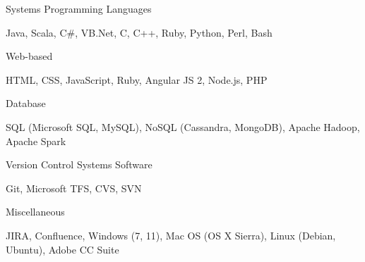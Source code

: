 \begin{cventries}
  \cventry
    {Systems}
    {Programming Languages}
    { }
    { }
    {
      \begin{cvitems}
        \item {Java, Scala, C\#, VB.Net, C, C++, Ruby, Python, Perl, Bash}
      \end{cvitems}
    }
  \cventry
    {Web-based}
    { }
    { }
    { }
    {
      \begin{cvitems}
        \item {HTML, CSS, JavaScript, Ruby, Angular JS 2, Node.js, PHP}
      \end{cvitems}
    }
  \cventry
    {Database}
    { }
    { }
    { }
    {
      \begin{cvitems}
        \item {SQL (Microsoft SQL, MySQL), NoSQL (Cassandra, MongoDB), Apache Hadoop, Apache Spark}
      \end{cvitems}
    }
  \cventry
    {Version Control Systems}
    {Software}
    { }
    { }
    {
      \begin{cvitems}
        \item {Git, Microsoft TFS, CVS, SVN}
      \end{cvitems}
    }
  \cventry
    {Miscellaneous}
    { }
    { }
    { }
    {
      \begin{cvitems}
        \item {JIRA, Confluence, Windows (7, 11), Mac OS (OS X Sierra), Linux (Debian, Ubuntu), Adobe CC Suite}
      \end{cvitems}
    }
\end{cventries}

